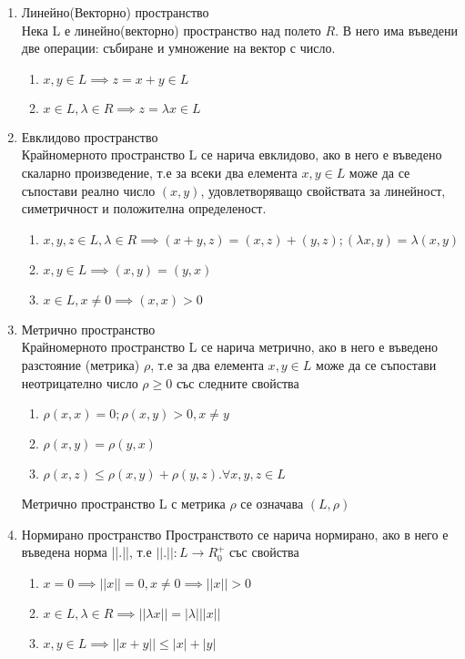 \documentclass[fleqn]{article}
\begin{document}
\begin{enumerate}
	\item Линейно(Векторно) пространство \\
	Нека L е линейно(векторно) пространство над полето $R$. В него има въведени две операции: събиране и умножение на вектор с число.
	\begin{enumerate}
 		\item $x,y \in L \implies z = x+ y \in L $
		\item $x \in L, \lambda \in R \implies z = \lambda x \in L$
	\end{enumerate}
	\item  Евклидово пространство\\
Крайномерното пространство L се нарича евклидово, ако в него е въведено скаларно произведение, т.е за всеки два елемента $x,y \in L$ може да се съпостави реално число $(x,y)$, удовлетворяващо свойствата за линейност, симетричност и положителна определеност.

	\begin{enumerate}
 		\item $x,y,z \in L ,\lambda \in R \implies (x+y,z) = (x,z) + (y,z); (\lambda x,y) = \lambda(x,y)$
		\item $x,y \in L \implies (x,y) = (y,x)$
		\item $x \in L, x\neq 0 \implies (x,x) > 0 $
	\end{enumerate}
	\item Метрично пространство\\
Крайномерното пространство L се нарича метрично, ако в него е въведено разстояние (метрика) $\rho$, т.е за два елемента $x,y \in L$ може да се съпостави неотрицателно число  $\rho \geq 0 $  със следните свойства
	\begin{enumerate}
 		\item $\rho(x,x) = 0 ; \rho(x,y) > 0 , x\neq y $
		\item $\rho(x,y) = \rho(y,x)$
		\item $\rho(x,z) \leq \rho(x,y) + \rho(y,z). \forall x,y,z \in L$
	\end{enumerate}
Метрично пространство L с метрика $\rho$ се означава $(L,\rho)$
	\item Нормирано пространство
Пространството се нарича нормирано, ако в него е въведена норма ||.||, т.е $||.||: L \rightarrow R_0^+$ със свойства 
\begin{enumerate}
 		\item $x = 0  \implies ||x|| = 0, x \neq 0  \implies ||x|| > 0$
		\item $x \in L, \lambda \in R \implies ||\lambda x|| = |\lambda|  ||x||$
		\item $x,y \in L \implies ||x+y|| \leq |x| + |y|$
	\end{enumerate}
\end{enumerate}
\end{document}
